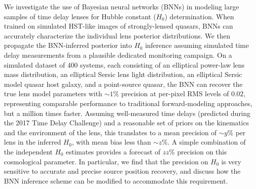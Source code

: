 We investigate the use of Bayesian neural networks (BNNs) in modeling large samples of time delay lenses for Hubble constant ($H_0$) determination. When trained on simulated HST-like images of strongly-lensed quasars, BNNs can accurately characterize the individual lens posterior distributions. We then propagate the BNN-inferred posterior into $H_0$ inference assuming simulated time delay measurements from a plausible dedicated monitoring campaign. 
On a simulated dataset of 400 systems, each consisting of an elliptical power-law lens mass distribution, an elliptical Sersic lens light distribution, an elliptical Sersic model quasar host galaxy, and a point-source quasar, the BNN can recover the true lens model parameters with $\sim 1$\% precision at per-pixel RMS levels of $0.02$, representing comparable performance to traditional forward-modeling approaches, but a million times faster. 
Assuming well-measured time delays (predicted during the 2017 Time Delay Challenge) and a reasonable set of priors on the kinematics and the environment of the lens, this translates to a mean precision of $\sim y$\% per lens in the inferred $H_0$, with mean bias less than $\sim z\%$. A simple combination of the independent $H_0$ estimates provides a forecast of $zz \%$ precision on this cosmological parameter.
In particular, we find that the precision on $H_0$ is very sensitive to accurate and precise source position recovery, and discuss how the BNN inference scheme can be modified to accommodate this requirement.
